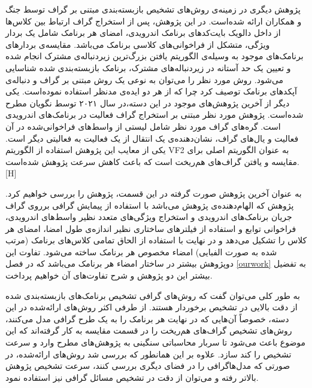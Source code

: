 پژوهش دیگری در زمینه‌ی روش‌های تشخیص بازبسته‌بندی مبتنی بر گراف توسط جنگ و همکاران ارائه شده‌است. در این پژوهش، پس از استخراج گراف ارتباط بین کلاس‌ها از داخل دالویک بایت‌کد‌های برنامک اندرویدی، امضای هر برنامک شامل یک بردار ویژگی، متشکل از فراخوانی‌‌های کلاسی برنامک می‌باشد. مقایسه‌ی بردار‌های برنامک‌های موجود به وسیله‌ی الگوریتم یافتن بزر‌گ‌ترین زیر‌دنباله‌ی مشترک‌ انجام شده و تعیین یک حد آستانه در زیر‌دنباله‌های مشترک، برنامک‌ بازبسته‌بندی شده شناسایی می‌شود. روش مورد نظر را می‌توان به نوعی یک روش مبتنی بر گراف و دنباله‌ی آپکد‌های برنامک توصیف کرد چرا که از هر دو ایده‌ی مدنظر استفاده نموده‌است. یکی دیگر از آخرین پژوهش‌های موجود در این دسته،‌در سال ۲۰۲۱ توسط نگویان مطرح شده‌است. پژوهش مورد نظر مبتنی بر استخراج گراف فعالیت‌‌ در برنامک‌های اندرویدی است. گره‌های گراف مورد نظر شامل لیستی از واسط‌های فراخوانی‌شده در آن فعالیت و یال‌های گراف، نشان‌دهنده‌ی یک انتقال از یک فعالیت به فعالیتی دیگر‌ است. یکی از معایب این پژوهش استفاده از الگوریتم VF2 به عنوان الگوریتم اصلی برای مقایسه‌ و یافتن گراف‌های هم‌ریخت است که باعث کاهش سرعت پژوهش شده‌است.
[H]
\vspace{1em}

به عنوان آخرین پژوهش صورت گرفته در این قسمت، پژوهش را بررسی خواهیم کرد. پژوهش  که الهام‌دهنده‌ی پژوهش  می‌باشد با استفاده از پیمایش گرافی برروی گراف‌ جریان برنامک‌های اندرویدی و استخراج ویژگی‌های متعدد نظیر واسط‌های اندرویدی، فراخوانی توابع و استفاده از فیلتر‌های ساختاری نظیر اندازه‌ی طول امضا، امضا‌ی هر کلاس را تشکیل می‌دهد و در نهایت با استفاده از الحاق تمامی کلاس‌های برنامک (مرتب شده به صورت الفبایی) امضا‌‌ء مخصوص هر برنامک ساخته می‌شود. تفاوت این دوپژوهش بیشتر در ساختار امضاء هر برنامک می‌باشد که در فصل
\ref{ourwork}
به تفضیل بیشتر این دو پژوهش و شرح تفاوت‌های آن خواهیم پرداخت.

به طور کلی می‌توان گفت که روش‌های گرافی تشخیص برنامک‌های بازبسته‌بندی شده از دقت بالایی در تشخیص برخوردار هستند. از طرفی اکثر روش‌های ارائه‌شده در این دسته، خصوصاً آن‌هایی که در نهایت هر برنامک را به یک طرح گرافی مدل می‌کنند، روش‌های تشخیص گراف‌های هم‌ریخت را در قسمت مقایسه به کار گرفته‌اند که این موضوع باعث می‌شود تا سربار محاسباتی سنگینی به پژوهش‌های مطرح وارد و سرعت تشخیص را کند سازد. علاوه بر این همانطور که بررسی شد روش‌های ارائه‌شده، در صورتی که مدل‌هاگرافی را در فضای دیگری بررسی کنند، سرعت تشخیص پژوهش بالاتر رفته و می‌توان از دقت در تشخیص مسائل گرافی نیز استفاده نمود.


